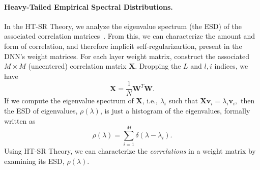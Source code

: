 \paragraph{Heavy-Tailed Empirical Spectral Distributions.}
%
%
In the HT-SR Theory, we analyze the eigenvalue spectrum (the ESD) of the associated correlation matrices~\cite{MM18_TR}.
From this, we can characterize the amount and form of correlation, and therefore implicit self-regularizartion, present in the DNN's weight matrices.
For each layer weight matrix, construct the associated $M\times M$ (uncentered) correlation matrix $\mathbf{X}$. 
Dropping the $L$ and $l,i$ indices, we have
$$
\mathbf{X} = \frac{1}{N}\mathbf{W}^{T}\mathbf{W}.
$$
%
If we compute the eigenvalue spectrum of $\mathbf{X}$, i.e., $\lambda_i$ such that
$  %
\mathbf{X}\mathbf{v}_{i}=\lambda_{i}\mathbf{v}_{i} , 
$  %
then the ESD of eigenvalues, $\rho(\lambda)$, is just a histogram of the eigenvalues, formally written as
\begin{equation}
\rho(\lambda)=\sum\limits_{i=1}^{M}\delta(\lambda-\lambda_{i})  .
\label{eqn:eigenval_hist}
\end{equation}
%
Using HT-SR Theory, we can characterize the \emph{correlations} in a weight matrix by examining its ESD, $\rho(\lambda)$.
